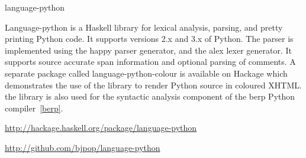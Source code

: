 \begin{hcarentry}[new]{language-python}
\label{language-python}
\makeheader

Language-python is a Haskell library for lexical analysis,
parsing, and pretty printing Python code. It supports versions 2.x
and 3.x of Python. The parser is implemented using the happy
parser generator, and the alex lexer generator.
It supports source accurate span information and optional parsing of
comments. A separate package called language-python-colour is available
on Hackage which demonstrates the use of the library to render
Python source in coloured XHTML.
the library is also used for the syntactic analysis component of the berp
Python compiler~\cref{berp}.

\FurtherReading
\begin{compactitem}
\item \url{http://hackage.haskell.org/package/language-python}
\item \url{http://github.com/bjpop/language-python}
\end{compactitem}
\end{hcarentry}
